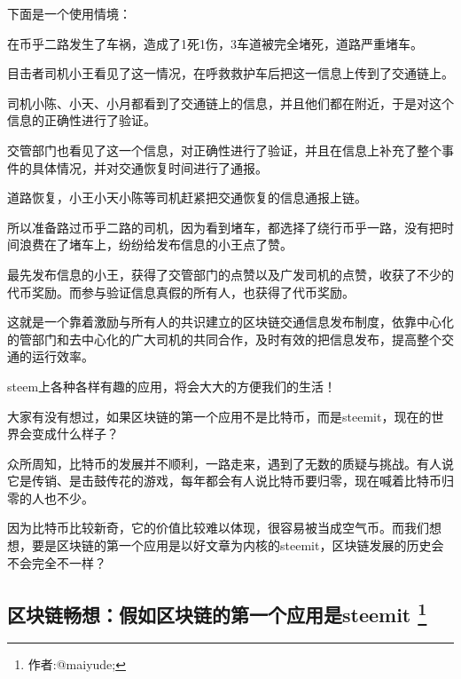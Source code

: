 \documentclass[]{ctexbook}
\begin{document}
下面是一个使用情境：

在币乎二路发生了车祸，造成了1死1伤，3车道被完全堵死，道路严重堵车。

目击者司机小王看见了这一情况，在呼救救护车后把这一信息上传到了交通链上。

司机小陈、小天、小月都看到了交通链上的信息，并且他们都在附近，于是对这个信息的正确性进行了验证。

交管部门也看见了这一个信息，对正确性进行了验证，并且在信息上补充了整个事件的具体情况，并对交通恢复时间进行了通报。

道路恢复，小王小天小陈等司机赶紧把交通恢复的信息通报上链。

所以准备路过币乎二路的司机，因为看到堵车，都选择了绕行币乎一路，没有把时间浪费在了堵车上，纷纷给发布信息的小王点了赞。

最先发布信息的小王，获得了交管部门的点赞以及广发司机的点赞，收获了不少的代币奖励。而参与验证信息真假的所有人，也获得了代币奖励。

这就是一个靠着激励与所有人的共识建立的区块链交通信息发布制度，依靠中心化的管部门和去中心化的广大司机的共同合作，及时有效的把信息发布，提高整个交通的运行效率。

steem上各种各样有趣的应用，将会大大的方便我们的生活！

大家有没有想过，如果区块链的第一个应用不是比特币，而是steemit，现在的世界会变成什么样子？

众所周知，比特币的发展并不顺利，一路走来，遇到了无数的质疑与挑战。有人说它是传销、是击鼓传花的游戏，每年都会有人说比特币要归零，现在喊着比特币归零的人也不少。

因为比特币比较新奇，它的价值比较难以体现，很容易被当成空气币。而我们想想，要是区块链的第一个应用是以好文章为内核的steemit，区块链发展的历史会不会完全不一样？

\hypertarget{jrqkldigyys_steemit}{%
\subsection[区块链畅想：假如区块链的第一个应用是steemit ]{\texorpdfstring{区块链畅想：假如区块链的第一个应用是steemit \footnote{作者:@maiyude;}}{区块链畅想：假如区块链的第一个应用是steemit }}\label{jrqkldigyys_steemit}}
\end{document}
